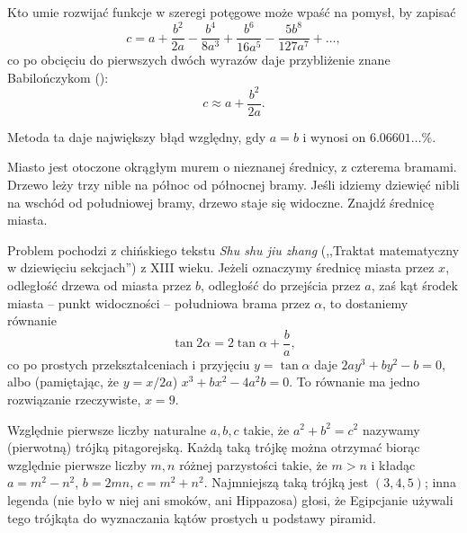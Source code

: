 Kto umie rozwijać funkcje w szeregi potęgowe może wpaść na pomysł, by zapisać
\begin{equation}
    c = a + \frac{b^2}{2a} - \frac{b^4}{8a^3} + \frac{b^6}{16a^5} - \frac{5b^8}{127a^7} + \ldots,
\end{equation}
co po obcięciu do pierwszych dwóch wyrazów daje przybliżenie znane Babilończykom (\cite[s. 6]{eves1_1972}):
\begin{equation}
    c \approx a + \frac{b^2}{2a}.
\end{equation}

Metoda ta daje największy błąd względny, gdy $a = b$ i wynosi on $6.06601\ldots \%$.

\begin{problem} %
    Miasto jest otoczone okrągłym murem o nieznanej średnicy, z czterema bramami.
    Drzewo leży trzy nible na północ od północnej bramy.
    Jeśli idziemy dziewięć nibli na wschód od południowej bramy, drzewo staje się widoczne. 
    Znajdź średnicę miasta.
\end{problem}

Problem pochodzi z chińskiego tekstu \emph{Shu shu jiu zhang} (,,Traktat matematyczny w dziewięciu sekcjach'') z XIII wieku.
Jeżeli oznaczymy średnicę miasta przez $x$, odległość drzewa od miasta przez $b$, odległość do przejścia przez $a$, zaś kąt środek miasta -- punkt widoczności -- południowa brama przez $\alpha$, to dostaniemy równanie
\begin{equation}
    \tan 2 \alpha = 2 \tan \alpha + \frac ba,
\end{equation}
co po prostych przekształceniach i przyjęciu $y = \tan \alpha$ daje
$
    2ay^3 + by^2 - b = 0
$,
albo (pamiętając, że $y = x/2a$)
$
    x^3 + bx^2 - 4a^2 b = 0
$.
To równanie ma jedno rozwiązanie rzeczywiste, $x = 9$.

Względnie pierwsze liczby naturalne $a, b, c$ takie, że $a^2 + b^2 = c^2$ nazywamy (pierwotną) trójką pitagorejską.
%
Każdą taką trójkę można otrzymać biorąc względnie pierwsze liczby $m, n$ różnej parzystości takie, że $m > n$ i kładąc $a = m^2 - n^2$, $b = 2 mn$, $c = m^2 + n^2$.
Najmniejszą taką trójką jest $(3, 4, 5)$; inna legenda (nie było w niej ani smoków, ani Hippazosa) głosi, że Egipcjanie używali tego trójkąta do wyznaczania kątów prostych u podstawy piramid.

